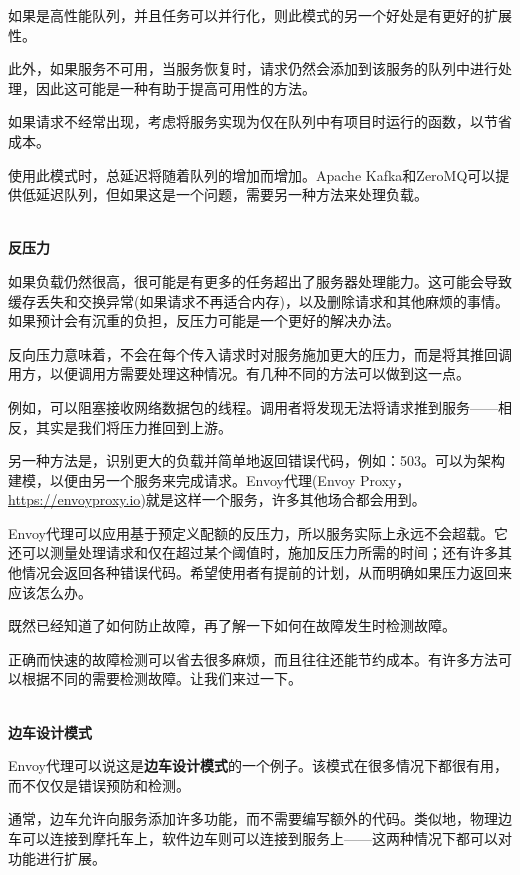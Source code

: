 如果是高性能队列，并且任务可以并行化，则此模式的另一个好处是有更好的扩展性。

此外，如果服务不可用，当服务恢复时，请求仍然会添加到该服务的队列中进行处理，因此这可能是一种有助于提高可用性的方法。

如果请求不经常出现，考虑将服务实现为仅在队列中有项目时运行的函数，以节省成本。

使用此模式时，总延迟将随着队列的增加而增加。Apache Kafka和ZeroMQ可以提供低延迟队列，但如果这是一个问题，需要另一种方法来处理负载。

\hspace*{\fill} \\ %
\noindent
\textbf{反压力}

如果负载仍然很高，很可能是有更多的任务超出了服务器处理能力。这可能会导致缓存丢失和交换异常(如果请求不再适合内存)，以及删除请求和其他麻烦的事情。如果预计会有沉重的负担，反压力可能是一个更好的解决办法。

反向压力意味着，不会在每个传入请求时对服务施加更大的压力，而是将其推回调用方，以便调用方需要处理这种情况。有几种不同的方法可以做到这一点。

例如，可以阻塞接收网络数据包的线程。调用者将发现无法将请求推到服务——相反，其实是我们将压力推回到上游。

另一种方法是，识别更大的负载并简单地返回错误代码，例如：503。可以为架构建模，以便由另一个服务来完成请求。Envoy代理(Envoy Proxy，\url{https://envoyproxy.io})就是这样一个服务，许多其他场合都会用到。

Envoy代理可以应用基于预定义配额的反压力，所以服务实际上永远不会超载。它还可以测量处理请求和仅在超过某个阈值时，施加反压力所需的时间；还有许多其他情况会返回各种错误代码。希望使用者有提前的计划，从而明确如果压力返回来应该怎么办。

既然已经知道了如何防止故障，再了解一下如何在故障发生时检测故障。


正确而快速的故障检测可以省去很多麻烦，而且往往还能节约成本。有许多方法可以根据不同的需要检测故障。让我们来过一下。

\hspace*{\fill} \\ %
\noindent
\textbf{边车设计模式}

Envoy代理可以说这是\textbf{边车设计模式}的一个例子。该模式在很多情况下都很有用，而不仅仅是错误预防和检测。

通常，边车允许向服务添加许多功能，而不需要编写额外的代码。类似地，物理边车可以连接到摩托车上，软件边车则可以连接到服务上——这两种情况下都可以对功能进行扩展。

